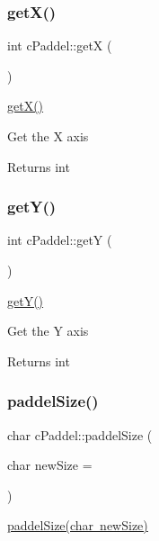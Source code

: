 \subsubsection{\texorpdfstring{get\+X()}{getX()}}
{\footnotesize\ttfamily int c\+Paddel\+::getX (\begin{DoxyParamCaption}{ }\end{DoxyParamCaption})}



\mbox{\hyperlink{classc_paddel_aaa833a367eab3cc275d7b67b4c3b68e4}{get\+X()}} 

Get the X axis \begin{DoxyReturn}{Returns}
int 
\end{DoxyReturn}
\mbox{\label{classc_paddel_a96cd3a3c7f5678b7e5f8f4eaca271ba2}} 
\subsubsection{\texorpdfstring{get\+Y()}{getY()}}
{\footnotesize\ttfamily int c\+Paddel\+::getY (\begin{DoxyParamCaption}{ }\end{DoxyParamCaption})}



\mbox{\hyperlink{classc_paddel_a96cd3a3c7f5678b7e5f8f4eaca271ba2}{get\+Y()}} 

Get the Y axis \begin{DoxyReturn}{Returns}
int 
\end{DoxyReturn}
\mbox{\label{classc_paddel_ab291cc9d81b3d169d11fba7d7b57186d}} 
\subsubsection{\texorpdfstring{paddel\+Size()}{paddelSize()}}
{\footnotesize\ttfamily char c\+Paddel\+::paddel\+Size (\begin{DoxyParamCaption}\item[{char}]{new\+Size = {} }\end{DoxyParamCaption})}



\mbox{\hyperlink{classc_paddel_ab291cc9d81b3d169d11fba7d7b57186d}{paddel\+Size(char new\+Size)}} 

